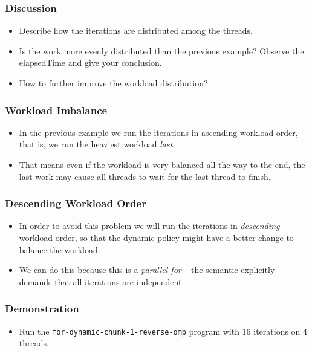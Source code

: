 \documentclass{beamer}
\begin{document}
\begin{frame}
  \frametitle{Discussion}
  \begin{itemize}
  \item Describe how the iterations are distributed among the threads.
  \item Is the work more evenly distributed than the previous example?
    Observe the elapsedTime and give your conclusion.
  \item How to further improve the workload distribution?
  \end{itemize}
\end{frame}


\begin{frame}
  \frametitle{Workload Imbalance}
  \begin{itemize}
  \item In the previous example we run the iterations in ascending
    workload order, that is, we run the heaviest workload {\em last}.
  \item That means even if the workload is very balanced all the way to
    the end, the last work may cause all threads to wait for the last
    thread to finish.
  \end{itemize}
\end{frame}

\begin{frame}
  \frametitle{Descending Workload Order}
  \begin{itemize}
  \item In order to avoid this problem we will run the iterations in
    {\em descending} workload order, so that the dynamic policy might
    have a better change to balance the workload.
  \item We can do this because this is a {\em parallel for} -- the
    semantic explicitly demands that all iterations are independent.
  \end{itemize}
\end{frame}

\begin{frame}
\end{frame}

\begin{frame}
  \frametitle{Demonstration}
  \begin{itemize}
  \item Run the {\tt for-dynamic-chunk-1-reverse-omp} program with 16
    iterations on 4 threads.
  \end{itemize}
\end{frame}
\end{document}
